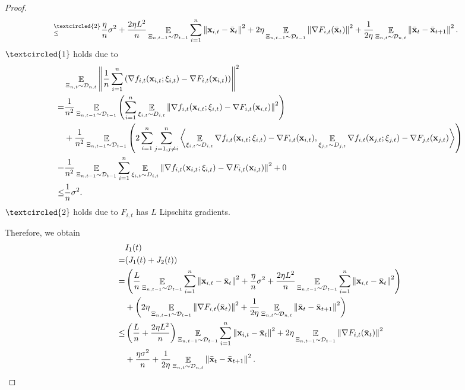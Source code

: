\documentclass{article}
\begin{document}
\begin{proof}
\begin{align}
\refabovecir{\le}{\textcircled{2}} & \frac{\eta}{n} \sigma^2 + \frac{2\eta L^2}{n}\EE_{ \Xi_{n,t-1} \sim \Dcal_{t-1} }\sum_{i=1}^n \lrnorm{\x_{i,t} - \bar{\x}_t }^2 + 2\eta \EE_{ \Xi_{n,t-1} \sim \Dcal_{t-1} }\lrnorm{\nabla F_{i,t}(\bar{\x}_t)}^2 + \frac{1}{2\eta} \EE_{ \Xi_{n,t} \sim \Dcal_{n,t} }\lrnorm{ \bar{\x}_t - \bar{\x}_{t+1}}^2.
\end{align} $\textcircled{1}$ holds due to
\begin{align}
\nonumber
& \mathop{\mathbb{E}}_{ \Xi_{n,t} \sim \mathcal{D}_{n,t} }\left\lVert\frac{1}{n}\sum_{i=1}^n \left(  \nabla f_{i,t}({\bf x}_{i,t};\xi_{i,t}) - \nabla F_{i,t}({\bf x}_{i,t})  \right) \right\rVert^2 \\ \nonumber
= & \frac{1}{n^2}\mathop{\mathbb{E}}_{ \Xi_{n,t-1} \sim \mathcal{D}_{t-1} }\left(  \sum_{i=1}^n \mathop{\mathbb{E}}_{ \xi_{i,t} \sim D_{i,t} }\left\lVert \nabla f_{i,t}({\bf x}_{i,t};\xi_{i,t}) - \nabla F_{i,t}({\bf x}_{i,t}) \right\rVert^2   \right) \\ \nonumber 
& + \frac{1}{n^2}\mathop{\mathbb{E}}_{ \Xi_{n,t-1} \sim \mathcal{D}_{t-1} }\left( 2\sum_{i=1}^n\sum_{j=1, j\neq i}^n\left\langle \mathop{\mathbb{E}}_{ \xi_{i,t} \sim D_{i,t} }\nabla f_{i,t}({\bf x}_{i,t};\xi_{i,t}) - \nabla F_{i,t}({\bf x}_{i,t}),  \mathop{\mathbb{E}}_{ \xi_{j,t} \sim D_{j,t} } \nabla f_{i,t}({\bf x}_{j,t};\xi_{j,t}) - \nabla F_{j,t}({\bf x}_{j,t}) \right\rangle  \right) \\ \nonumber
= & \frac{1}{n^2}\mathop{\mathbb{E}}_{ \Xi_{n,t-1} \sim \mathcal{D}_{t-1} }\sum_{i=1}^n \mathop{\mathbb{E}}_{ \xi_{i,t} \sim D_{i,t} }\left\lVert \nabla f_{i,t}({\bf x}_{i,t};\xi_{i,t}) - \nabla F_{i,t}({\bf x}_{i,t}) \right\rVert^2 + 0 \\ \nonumber
\le & \frac{1}{n} \sigma^2.
\end{align} $\textcircled{2}$ holds due to $F_{i,t}$ has $L$ Lipschitz gradients.

 Therefore, we obtain
\begin{align}
\nonumber
& I_1(t) \\ \nonumber 
= &  (J_1(t) + J_2(t)) \\ \nonumber
= &   \left(  \frac{L}{n}\mathop{\mathbb{E}}_{ \Xi_{n,t-1} \sim \mathcal{D}_{t-1} }\sum_{i=1}^n \left\lVert{\bf x}_{i,t} - \bar{{\bf x}}_t\right\rVert^2 +\frac{\eta}{n} \sigma^2 + \frac{2\eta L^2}{n}\mathop{\mathbb{E}}_{ \Xi_{n,t-1} \sim \mathcal{D}_{t-1} }\sum_{i=1}^n \left\lVert{\bf x}_{i,t} - \bar{{\bf x}}_t \right\rVert^2  \right) \\ \nonumber
& +  \left(  2\eta \mathop{\mathbb{E}}_{ \Xi_{n,t-1} \sim \mathcal{D}_{t-1} }\left\lVert\nabla F_{i,t}(\bar{{\bf x}}_t)\right\rVert^2 + \frac{1}{2\eta} \mathop{\mathbb{E}}_{ \Xi_{n,t} \sim \mathcal{D}_{n,t} }\left\lVert \bar{{\bf x}}_t - \bar{{\bf x}}_{t+1}\right\rVert^2  \right) \\ \nonumber
\le &   \left(  \frac{L}{n} + \frac{2\eta L^2}{n}  \right)\mathop{\mathbb{E}}_{ \Xi_{n,t-1} \sim \mathcal{D}_{t-1} }\sum_{i=1}^n\left\lVert{\bf x}_{i,t} - \bar{{\bf x}}_t \right\rVert^2   + 2\eta  \mathop{\mathbb{E}}_{ \Xi_{n,t-1} \sim \mathcal{D}_{t-1} }\left\lVert\nabla F_{i,t}(\bar{{\bf x}}_t)\right\rVert^2 \\ \nonumber 
&+ \frac{\eta  \sigma^2}{n} +  \frac{1}{2\eta} \mathop{\mathbb{E}}_{ \Xi_{n,t} \sim \mathcal{D}_{n,t} }\left\lVert \bar{{\bf x}}_t - \bar{{\bf x}}_{t+1}\right\rVert^2.
\end{align}


\end{proof}
\end{document}
